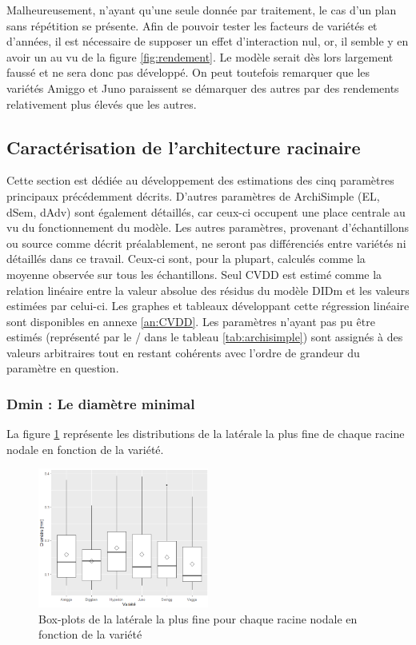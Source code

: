 Malheureusement, n'ayant qu'une seule donnée par traitement, le cas d'un plan sans répétition se présente.
Afin de pouvoir tester les facteurs de variétés et d'années, il est nécessaire de supposer un effet d'interaction nul, or, il semble y en avoir un au vu de la figure \ref{fig:rendement}.
Le modèle serait dès lors largement faussé et ne sera donc pas développé.
On peut toutefois remarquer que les variétés Amiggo et Juno paraissent se démarquer des autres par des rendements relativement plus élevés que les autres.

\subsection{Caractérisation de l'architecture racinaire}

Cette section est dédiée au développement des estimations des cinq paramètres principaux précédemment décrits.
D'autres paramètres de ArchiSimple (EL, dSem, dAdv) sont également détaillés, car ceux-ci occupent une place centrale au vu du fonctionnement du modèle.
Les autres paramètres, provenant d'échantillons ou source comme décrit préalablement, ne seront pas différenciés entre variétés ni détaillés dans ce travail.
Ceux-ci sont, pour la plupart, calculés comme la moyenne observée sur tous les échantillons.
Seul CVDD est estimé comme la relation linéaire entre la valeur absolue des résidus du modèle DIDm et les valeurs estimées par celui-ci.
Les graphes et tableaux développant cette régression linéaire sont disponibles en annexe \ref{an:CVDD}.
Les paramètres n'ayant pas pu être estimés (représenté par le / dans le tableau \ref{tab:archisimple}) sont assignés à des valeurs arbitraires tout en restant cohérents avec l'ordre de grandeur du paramètre en question.

\subsubsection{Dmin : Le diamètre minimal}

La figure \ref{fig:boxplot Dmin} représente les distributions de la latérale la plus fine de chaque racine nodale en fonction de la variété.

\begin{figure}[ht]
\centering
\includegraphics[width=0.5\textwidth]{Image/boxplot Dmin.png}
\caption{Box-plots de la latérale la plus fine pour chaque racine nodale en fonction de la variété}
\label{fig:boxplot Dmin}
\end{figure}

